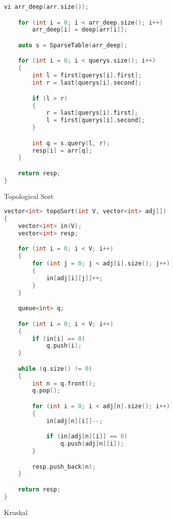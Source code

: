 \documentclass[leter]{amsart}
\begin{document}
\begin{multicols}{2}
\begin{lstlisting}[language=C++]
    vi arr_deep(arr.size());

    for (int i = 0; i < arr_deep.size(); i++)
        arr_deep[i] = deep[arr[i]];

    auto s = SparseTable(arr_deep);

    for (int i = 0; i < querys.size(); i++)
    {
        int l = first[querys[i].first];
        int r = last[querys[i].second];

        if (l > r)
        {
            r = last[querys[i].first];
            l = first[querys[i].second];
        }

        int q = s.query(l, r);
        resp[i] = arr[q];
    }

    return resp;
}

\end{lstlisting}
\end{multicols}
Topological Sort
\begin{multicols}{2}
\begin{lstlisting}[language=C++]
vector<int> topoSort(int V, vector<int> adj[])
{
    vector<int> in(V);
    vector<int> resp;

    for (int i = 0; i < V; i++)
    {
        for (int j = 0; j < adj[i].size(); j++)
        {
            in[adj[i][j]]++;
        }
    }

    queue<int> q;

    for (int i = 0; i < V; i++)
    {
        if (in[i] == 0)
            q.push(i);
    }

    while (q.size() != 0)
    {
        int n = q.front();
        q.pop();

        for (int i = 0; i < adj[n].size(); i++)
        {
            in[adj[n][i]]--;

            if (in[adj[n][i]] == 0)
                q.push(adj[n][i]);
        }

        resp.push_back(n);
    }

    return resp;
}

\end{lstlisting}
\end{multicols}
Kruskal
\end{document}

